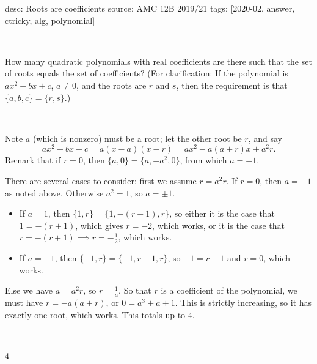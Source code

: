 desc: Roots are coefficients
source: AMC 12B 2019/21
tags: [2020-02, answer, ctricky, alg, polynomial]

---

How many quadratic polynomials with real coefficients are there such that the set of roots equals the set of coefficients? (For clarification: If the polynomial is $ax^2+bx+c$, $a\ne0$, and the roots are $r$ and $s$, then the requirement is that $\{a,b,c\}=\{r,s\}$.)

---

Note $a$ (which is nonzero) must be a root; let the other root be $r$, and say \[ax^2+bx+c=a(x-a)(x-r)=ax^2-a(a+r)x+a^2r.\]
Remark that if $r=0$, then $\{a,0\}=\{a,-a^2,0\}$, from which $a=-1$.

There are several cases to consider: first we assume $r=a^2r$. If $r=0$, then $a=-1$ as noted above. Otherwise $a^2=1$, so $a=\pm1$.
\begin{itemize}
    \item If $a=1$, then $\{1,r\}=\{1,-(r+1),r\}$, so either it is the case that $1=-(r+1)$, which gives $r=-2$, which works, or it is the case that $r=-(r+1)\implies r=-\tfrac12$, which works.
    \item If $a=-1$, then $\{-1,r\}=\{-1,r-1,r\}$, so $-1=r-1$ and $r=0$, which works.
\end{itemize}
Else we have $a=a^2r$, so $r=\tfrac1a$. So that $r$ is a coefficient of the polynomial, we must have $r=-a(a+r)$, or $0=a^3+a+1$. This is strictly increasing, so it has exactly one root, which works. This totals up to $4$.

---

4
